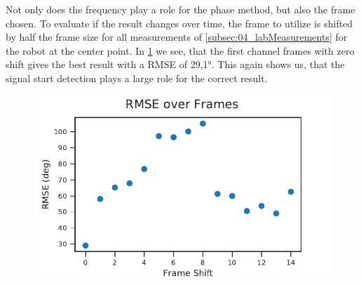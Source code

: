 Not only does the frequency play a role for the phase method,
but also the frame chosen.
To evaluate if the result changes over time, the frame to
utilize is shifted by half the frame size for all measurements
of \cref{subsec:04_labMeasurements} for the robot at the center
point.
In \cref{fig:04_phaseOverTime} we see, that the first channel frames
with zero shift gives the best result with a \ac{RMSE} of 29,1\si{\degree}.
This again shows us, that the signal start detection plays a
large role for the correct result.
\begin{figure}[ht]
	\centering
		\includegraphics[]{figures/evaluation/phase_over_time}
	\caption{}
	\label{fig:04_phaseOverTime}
\end{figure}
